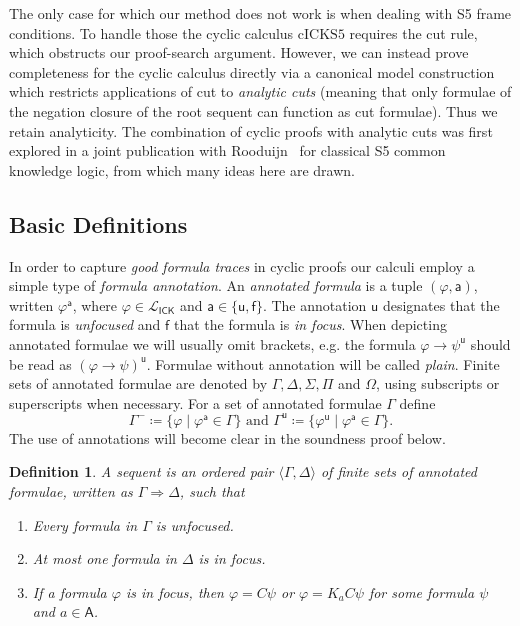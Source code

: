 \documentclass{myifcolog}
\newcommand\C {C}
\newcommand{\K}{K}
\newcommand\A{\mathsf{A}}
\newcommand{\agi}{a}
\newcommand{\ICK}{\mathsf{ICK}}
\newcommand{\LICK}{\mathcal{L}_{\ICK}}
\newcommand{\f}{\mathsf{f}}
\renewcommand{\u}{\mathsf{u}}
\newcommand{\cickss}{\mathrm{cICKS5}}
\newcommand{\an}{\mathsf{a}}
\newtheorem{definition}[theorem]{Definition}
\numberwithin{theorem}{section}
\begin{document}
The only case for which our method does not work is when dealing with S5 frame conditions. To handle those the cyclic calculus $\cickss$ requires the cut rule, which obstructs our proof-search argument. However, we can instead prove completeness for the cyclic calculus directly via a canonical model construction which restricts applications of cut to \emph{analytic cuts} (meaning that only formulae of the negation closure of the root sequent can function as cut formulae). Thus we retain analyticity. The combination of cyclic proofs with analytic cuts was first explored in a joint publication with Rooduijn~\cite{rooduijn_analytic_2022} for classical S5 common knowledge logic, from which many ideas here are drawn.




\subsection{Basic Definitions}

In order to capture \emph{good formula traces} in cyclic proofs our calculi employ a simple type of \emph{formula annotation}. An \emph{annotated formula} is a tuple $(\varphi, \an)$, written $\varphi^\an$, where $\varphi \in \LICK$ and $\an \in \{\u, \f\}$. The annotation $\u$ designates that the formula is \emph{unfocused} and $\f$ that the formula is \emph{in focus}. When depicting annotated formulae we will usually omit brackets, e.g. the formula $\varphi \rightarrow \psi^\u$ should be read as $(\varphi \rightarrow \psi)^\u$. Formulae without annotation will be called \emph{plain}. Finite sets of annotated formulae are denoted by $\Gamma, \Delta, \Sigma, \Pi$ and $\Omega$, using subscripts or superscripts when necessary. For a set of annotated formulae $\Gamma$ define
\[
    \Gamma^- \coloneqq \{\varphi \mid \varphi^\an \in \Gamma\}
    \text{ and }
    \Gamma^\u \coloneqq \{\varphi^\u \mid \varphi^\an \in \Gamma\}.
\]
The use of annotations will become clear in the soundness proof below. 

\begin{definition}
    A \emph{sequent}\index{sequent!for $\ICK$} is an ordered pair $\langle \Gamma, \Delta \rangle$ of finite sets of annotated formulae, written as $\Gamma \Rightarrow \Delta$, such that
    \begin{enumerate}
    \item Every formula in $\Gamma$ is unfocused.
    \item At most one formula in $\Delta$ is in focus.
    \item If a formula $\varphi$ is in focus, then $\varphi = \C \psi$ or $\varphi = \K_\agi \C \psi$ for some formula $\psi$ and $\agi \in \A$.
\end{enumerate}
\end{definition}
\end{document}
